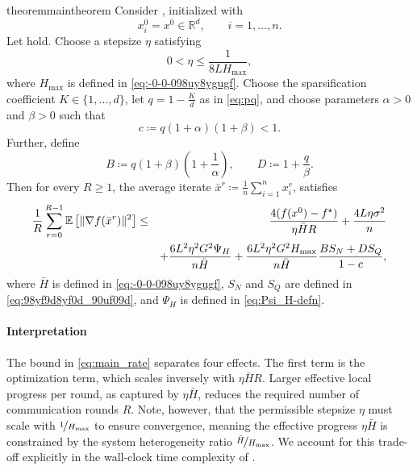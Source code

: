 \documentclass{article}
\newcommand{\R}{\mathbb{R}}  %
\newcommand{\eqdef}{\coloneqq}
\newcommand{\Exp}[1]{{\mathbb{E}} \left[ #1 \right]}
\theoremstyle{plain}
\theoremstyle{definition}
\begin{document}
\begin{restatable}{theorem}{maintheorem}\label{thm:main}
    Consider , initialized with
    $$%
        x_i^0 = x^0 \in \R^d,
        \qquad i=1,\dots,n.
    $$
    Let  hold.
    Choose a stepsize \(\eta\) satisfying
    $$%
        0<\eta \leq \frac{1}{8LH_{\max}},
    $$
    where \(H_{\max}\) is defined in \eqref{eq:-0-0-098uy8ygugf}.
    Choose the sparsification coefficient \(K \in \{1,\dots,d\}\), let \(q=1-\frac{K}{d}\) as in \eqref{eq:pq}, and choose parameters \(\alpha>0\) and \(\beta>0\) such that
    $$%
        c \eqdef q(1+\alpha)(1+\beta) < 1.
    $$
    Further, define
    $$%
        B \eqdef q(1+\beta)\left(1+\frac1\alpha\right),
        \qquad
        D \eqdef 1+\frac{q}{\beta}.
    $$
    Then for every \(R\ge 1\), the average iterate \(\bar x^r \eqdef \frac{1}{n}\sum_{i=1}^n x_i^r\), satisfies
    \begin{eqnarray}\label{eq:main_rate}%
        \frac1R\sum_{r=0}^{R-1}\Exp{\|\nabla f(\bar x^r)\|^2}
        &\leq& %
        \frac{4(f(x^0)-f^\star)}{\eta\bar H R}
        +
        \frac{4L\eta\sigma^2}{n}
        \notag\\
        &&+ %
        \frac{6L^2\eta^2G^2\Psi_H}{n\bar H}
        +
        \frac{6L^2\eta^2G^2H_{\max}}{n\bar H}
        \frac{BS_N+DS_Q}{1-c},
    \end{eqnarray}
    where
    \(\bar{H}\) is defined in \eqref{eq:-0-0-098uy8ygugf}, \(S_N\) and \(S_Q\) are defined in \eqref{eq:98yf9d8yf0d_90uf09d}, and
    \(\Psi_H\) is defined in \eqref{eq:Psi_H-defn}.
\end{restatable}

\paragraph{Interpretation} 
The bound in \eqref{eq:main_rate} separates four effects.
The first term is the optimization term, which scales inversely with $\eta \bar{H} R$.
Larger effective local progress per round, as captured by $\eta \bar{H}$, reduces the required number of communication rounds $R$. 
Note, however, that the permissible stepsize $\eta$ must scale with $\nicefrac{1}{H_{\max}}$ to ensure convergence, meaning the effective progress $\eta \bar{H}$ is constrained by the system heterogeneity ratio $\nicefrac{\bar{H}}{H_{\max}}$.
We account for this trade-off explicitly in the wall-clock time complexity of .
\end{document}
